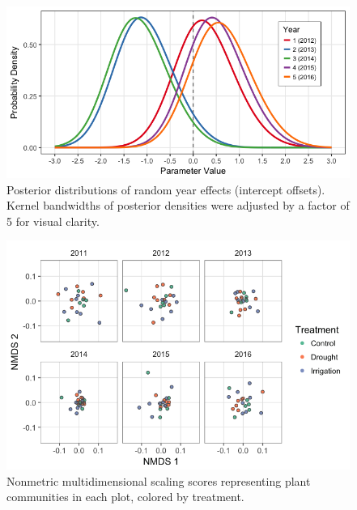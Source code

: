 \documentclass[fleqn,10pt,lineno]{wlpeerj} %
\begin{document}
\newpage{}

\begin{figure}[!ht]
  \centering
      \includegraphics[width=5in]{../figures/glmm_yeardiffs.png}
  \caption{Posterior distributions of random year effects (intercept offsets). Kernel bandwidths of posterior densities were adjusted by a factor of 5 for visual clarity.}
\end{figure}

\newpage{}

\begin{figure}[!ht]
  \centering
      \includegraphics[width=5in]{../figures/sppcomp_bray_all.png}
  \caption{Nonmetric multidimensional scaling scores representing plant communities in each plot, colored by treatment.}
\end{figure}

\newpage{}



\end{document}
